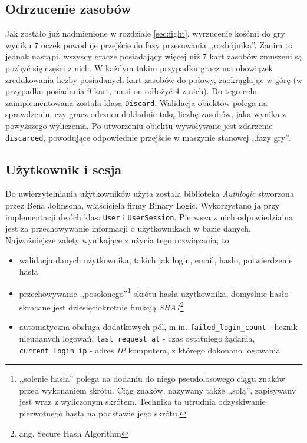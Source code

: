 \documentclass[11pt,twoside]{report}
\begin{document}
\subsection{Odrzucenie zasobów}
Jak zostało już nadmienione w rozdziale \ref{sec:fight}, wyrzucenie
kośćmi do gry wyniku 7 oczek powoduje przejście do fazy przesuwania
,,rozbójnika''. Zanim to jednak nastąpi, wszyscy gracze posiadający
więcej niż 7 kart zasobów zmuszeni są pozbyć się części z nich. W
każdym takim przypadku gracz ma obowiązek zredukowania liczby
posiadanych kart zasobów do połowy, zaokrąglając w górę (w przypadku
posiadania 9 kart, musi on odłożyć 4 z nich). Do tego celu
zaimplementowana została klasa \texttt{Discard}. Walidacja obiektów
polega na sprawdzeniu, czy gracz odrzuca dokładnie taką liczbę
zasobów, jaka wynika z powyższego wyliczenia. Po utworzeniu obiektu
wywoływane jest zdarzenie \texttt{discarded}, powodujące odpowiednie
przejście w maszynie stanowej ,,fazy gry''.

\subsection{Użytkownik i sesja}
Do uwierzytelniania użytkowników użyta została biblioteka
\emph{Authlogic} stworzona przez Bena Johnsona, właściciela firmy
Binary Logic. Wykorzystano ją przy implementacji dwóch klas:
\texttt{User} i \texttt{UserSession}. Pierwsza z nich odpowiedzialna
jest za przechowywanie informacji o użytkownikach w bazie
danych. Najważniejsze zalety wynikające z użycia tego rozwiązania, to:

\begin{itemize}
\item walidacja danych użytkownika, takich jak login, email, hasło,
  potwierdzenie hasła
\item przechowywanie ,,posolonego''\footnote{,,solenie hasła'' polega
    na dodaniu do niego pseudolosowego ciągu znaków przed wykonaniem
    skrótu. Ciąg znaków, nazywany także ,,solą'', zapisywany jest wraz
    z wyliczonym skrótem. Technika ta utrudnia odzyskiwanie
    pierwotnego hasła na podstawie jego skrótu.} skrótu hasła użytkownika,
  domyślnie hasło skracane jest dziesięciokrotnie funkcją
  \emph{SHA1}\footnote{ang. Secure Hash Algorithm}
\item automatyczna obsługa dodatkowych pól,
  m.in. \texttt{failed\_login\_count} - licznik nieudanych logowań,
  \texttt{last\_request\_at} - czas ostatniego żądania,
  \texttt{current\_login\_ip} - adres \emph{IP} komputera, z którego
  dokonano logowania
\end{itemize}
\end{document}
